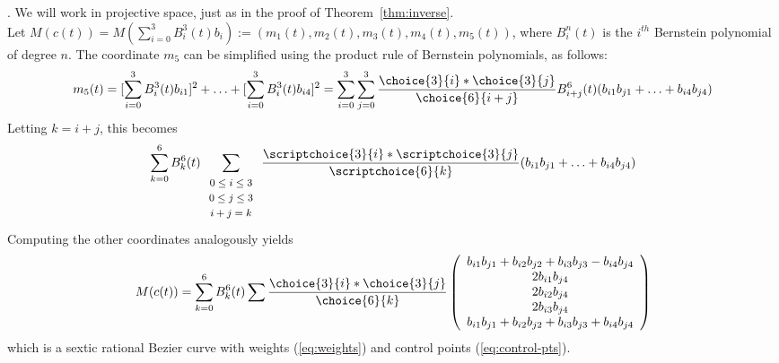 \cite{farin97}.
We will work in projective space, just as in the proof of 
Theorem~\ref{thm:inverse}.\\
Let $M(c(t)) = M(\sum_{i=0}^3 B_i^3(t) b_{i}) 
:= (m_1(t),m_2(t),m_3(t),m_4(t),m_5(t))$, 
where $B_i^n(t)$ is the $i^{th}$ Bernstein polynomial of degree $n$.
The coordinate $m_5$ can be simplified using the product rule 
of Bernstein polynomials, as follows:
\[ m_5(t) =  [\sum_{i=0}^3 B_i^3(t) b_{i1}]^2 + 
	\ldots + [\sum_{i=0}^3 B_i^3(t) b_{i4}]^2
     =   \sum_{i=0}^3 \sum_{j=0}^3 
	\frac{\choice{3}{i} * \choice{3}{j}}{\choice{6}{i+j}}
       B^6_{i+j}(t) (b_{i1} b_{j1} + \ldots + b_{i4} b_{j4})
\]
Letting $k=i+j$, this becomes
\[ \sum_{k=0}^6 B_k^6(t) 
	\sum_{\begin{array}{c}  \mbox{\footnotesize{$0 \leq i \leq 3$}} \\ 
			     \mbox{\footnotesize{$0 \leq j \leq 3$}} \\ 
			     \mbox{\footnotesize{$i+j=k$}}
			     \end{array}} 
	\frac{\scriptchoice{3}{i} * \scriptchoice{3}{j}}{\scriptchoice{6}{k}}
	(b_{i1} b_{j1} + \ldots + b_{i4} b_{j4}) \]
Computing the other coordinates analogously yields
\[ M(c(t)) = 
   \sum_{k=0}^6 B_k^6(t)
	\sum \frac{\choice{3}{i} * \choice{3}{j}}{\choice{6}{k}}
	\left( \begin{array}{c}
            b_{i1} b_{j1} + b_{i2} b_{j2} + b_{i3} b_{j3} - b_{i4} b_{j4} \\
            2b_{i1} b_{j4} \\
            2b_{i2} b_{j4} \\
            2b_{i3} b_{j4} \\
            b_{i1} b_{j1} + b_{i2} b_{j2} + b_{i3} b_{j3} + b_{i4} b_{j4}
	\end{array} \right) \]
%
which is a sextic rational Bezier curve with weights (\ref{eq:weights}) and 
control points (\ref{eq:control-pts}).
\QED

